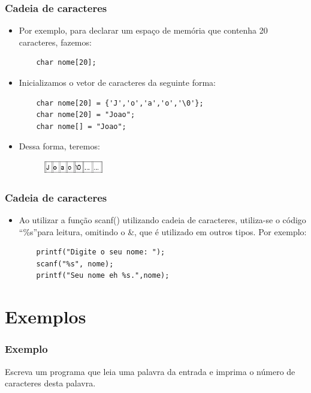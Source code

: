 \documentclass[aspectratio=169]{beamer}
\begin{document}
\begin{frame}[fragile]
\frametitle{Cadeia de caracteres}
\begin{itemize}
\item Por exemplo, para declarar um espaço de memória que contenha 20 caracteres, fazemos:
    \begin{lstlisting}
    char nome[20];
    \end{lstlisting}
\item Inicializamos o vetor de caracteres da seguinte forma:
    \begin{lstlisting}
    char nome[20] = {'J','o','a','o','\0'};
    char nome[20] = "Joao";
    char nome[] = "Joao";
    \end{lstlisting}
\item Dessa forma, teremos:

\begin{figure}[!h]
  \centering
  \includegraphics[width=75pt]{imgs/inicializacao.png}
  \label{fig_inicializacao}
\end{figure}
\end{itemize}
\end{frame}



\begin{frame}[fragile]
\frametitle{Cadeia de caracteres}
\begin{itemize}
\item Ao utilizar a função scanf() utilizando cadeia de caracteres, utiliza-se o código ``\%s''para leitura, omitindo o \&, que é utilizado em outros tipos. Por exemplo:
    \begin{lstlisting}
    printf("Digite o seu nome: ");
    scanf("%s", nome);
    printf("Seu nome eh %s.",nome);
    \end{lstlisting}

\end{itemize}
\end{frame}


\section{Exemplos}

\begin{frame}[fragile]
\frametitle{Exemplo}
Escreva um programa que leia uma palavra da entrada e imprima o número de caracteres desta palavra.
\end{frame}
\end{document}
